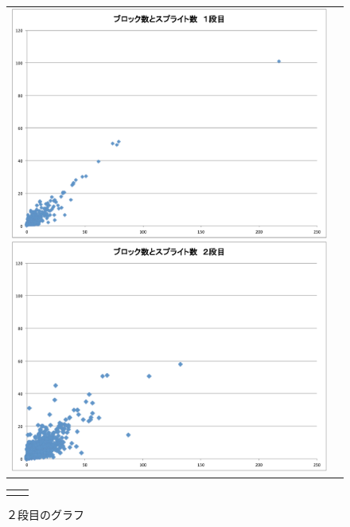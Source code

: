 \documentclass[a4paper,10pt,onecolumn,oneside,openany]{jsbook}
\begin{document}
\begin{figure}[h]
 \begin{tabular}{cc}
 	\begin{minipage}[t]{0.45\hsize}
	 \centering
	 \includegraphics[keepaspectratio, scale = 0.25]{block_splite_1.pdf}
	 \caption{１段目のグラフ}
	 \label{first_block_splite}
	\end{minipage}
        \begin{minipage}[t]{0.45\hsize}
	 \centering
	 \includegraphics[keepaspectratio, scale = 0.25]{block_splite_2.pdf}
	 \caption{２段目のグラフ}
	 \label{second_block_splite}
	\end{minipage}
 \end{tabular}
  \begin{tabular}{cc}
 	\begin{minipage}[t]{0.45\hsize}

\end{minipage}
\end{tabular}
\end{figure}
\end{document}
